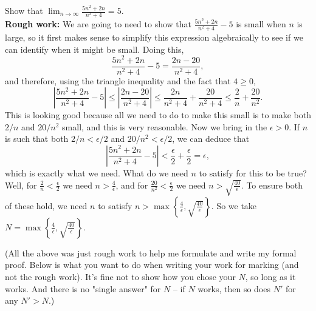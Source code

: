 \documentclass[11pt,dvipsnames]{book}
\numberwithin{figure}{section} %
\numberwithin{table}{section} %
\begin{document}
\begin{example}
Show that $\lim_{n\rightarrow \infty} \frac{5n^2+2n}{n^2+4}=5$. \\
%
%

{\bf Rough work:} We are going to need to show that $ \frac{5n^2+2n}{n^2+4}-5$ is small when $n$ is large, so it first makes sense to simplify this expression algebraically to see if we can identify when it might be small. Doing this,
\[\frac{5n^2+2n}{n^2+4}-5 =\frac{2n-20}{n^2+4},
\]
and therefore, using the triangle inequality and the fact that $4\geq0$,
\[\left|\frac{5n^2+2n}{n^2+4}-5\right|
\leq \left| \frac{2n-20}{n^2+4} \right|
\leq \frac{2n}{n^2 + 4} + \frac{20}{n^2 + 4}
\leq \frac{2}{n} + \frac{20}{n^2}.
\]
This is looking good because all we need to do to make this small is to make both $2/n$ and $20/n^2$ small, and this is very reasonable. Now we bring in the $\epsilon > 0$. If $n$ is such that both $2/n < \epsilon/2$ and $20/n^2 < \epsilon/2$, we can deduce that
\[\left|\frac{5n^2+2n}{n^2+4}-5\right| < \frac{\epsilon}{2}+ \frac{\epsilon}{2} = \epsilon,
\]
which is exactly what we need. What do we need $n$ to satisfy for this to be true? Well, for $\frac{2}{n} < \frac{\epsilon}{2}$ we need $n > \frac{4}{\epsilon}$, and for $\frac{20}{n^2} < \frac{\epsilon}{2}$ we need $n > \sqrt{\frac{40}{\epsilon}}$. To ensure both of these hold, we need $n$ to satisfy $n > \max\left\{\frac{4}{\epsilon}, \sqrt{\frac{40}{\epsilon}}\right\}.$ So we take $N = \max\left\{\frac{4}{\epsilon}, \sqrt{\frac{40}{\epsilon}}\right\}.$

(All the above was just rough work to help me formulate and write my formal proof. Below is what you want to do when writing your work for marking (and not the rough work). It's fine not to show how you chose your $N$, so long as it works. And there is no "single answer" for $N$ -- if $N$ works, then so does $N'$ for any $N'>N$.)\\


\end{example}
\end{document}
